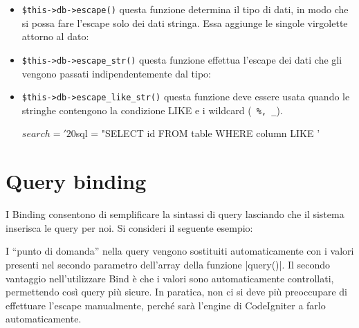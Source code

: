\begin{itemize}
\item \verb|$this->db->escape()| questa funzione determina il tipo di dati, in modo che si possa fare l'escape solo dei dati stringa. Essa aggiunge le singole virgolette attorno al dato:


\item \verb|$this->db->escape_str()| questa funzione effettua l'escape dei dati che gli vengono passati indipendentemente dal tipo:


\item \verb|$this->db->escape_like_str()| questa funzione deve essere usata quando le stringhe contengono la condizione LIKE e i wildcard (\verb| %, _|).

\begin{code}
$search = '20%
$sql = "SELECT id FROM table WHERE column LIKE '%
\end{code}
\end{itemize}

\section*{Query binding}
I Binding consentono di semplificare la sintassi di query lasciando che il sistema inserisca le query per noi. Si consideri il seguente esempio:


I ``punto di domanda'' nella query vengono sostituiti automaticamente con i valori presenti nel secondo parametro dell'array della funzione \var|query()|. Il secondo vantaggio nell'utilizzare Bind è che i valori sono automaticamente controllati, permettendo così query più sicure. In paratica, non ci si deve più preoccupare di effettuare l'escape manualmente, perché sarà l'engine di CodeIgniter a farlo automaticamente.
